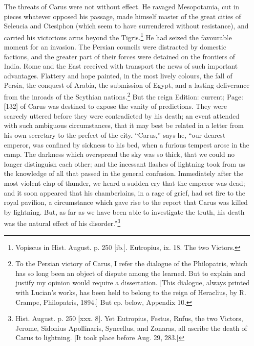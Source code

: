 The threats of Carus were not without effect. He ravaged Mesopotamia, cut in pieces whatever opposed his passage, made himself master of the great cities of Seleucia and Ctesiphon (which seem to have surrendered without resistance), and carried his victorious arms beyond the Tigris.\footnote{Vopiscus in Hist. August. p. 250 [ib.]. Eutropius, ix. 18. The two Victors.} He had seized the favourable moment for an invasion. The Persian councils were distracted by domestic factions, and the greater part of their forces were detained on the frontiers of India. Rome and the East received with transport the news of such important advantages. Flattery and hope painted, in the most lively colours, the fall of Persia, the conquest of Arabia, the submission of Egypt, and a lasting deliverance from the inroads of the Scythian nations.\footnote{To the Persian victory of Carus, I refer the dialogue of the Philopatris, which has so long been an object of dispute among the learned. But to explain and justify my opinion would require a dissertation. [This dialogue, always printed with Lucian\texthebrew{}’s works, has been held to belong to the reign of Heraclius, by R. Crampe, Philopatris, 1894.] But cp. below, Appendix 10.} But the reign Edition: current; Page: [132] of Carus was destined to expose the vanity of predictions. They were scarcely uttered before they were contradicted by his death; an event attended with such ambiguous circumstances, that it may best be related in a letter from his own secretary to the prefect of the city. \texthebrew{“}Carus,\texthebrew{}” says he, \texthebrew{“}our dearest emperor, was confined by sickness to his bed, when a furious tempest arose in the camp. The darkness which overspread the sky was so thick, that we could no longer distinguish each other; and the incessant flashes of lightning took from us the knowledge of all that passed in the general confusion. Immediately after the most violent clap of thunder, we heard a sudden cry that the emperor was dead; and it soon appeared that his chamberlains, in a rage of grief, had set fire to the royal pavilion, a circumstance which gave rise to the report that Carus was killed by lightning. But, as far as we have been able to investigate the truth, his death was the natural effect of his disorder.\texthebrew{}”\footnote{Hist. August. p. 250 [xxx. 8]. Yet Eutropius, Festus, Rufus, the two Victors, Jerome, Sidonius Apollinaris, Syncellus, and Zonaras, all ascribe the death of Carus to lightning. [It took place before Aug. 29, 283.]}

